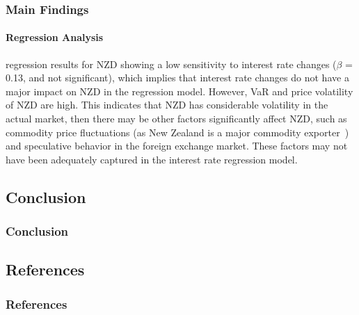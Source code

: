 \documentclass[10pt]{beamer}
\begin{document}
\begin{frame}
\frametitle{Main Findings}
\framesubtitle{Regression Analysis}
regression results for NZD showing a low sensitivity to interest rate changes ($\beta$ = 0.13, and not significant), which implies that interest rate changes
do not have a major impact on NZD in the regression model. However, VaR and price volatility of NZD are high. This indicates that NZD has considerable volatility
in the actual market, then there may be other factors significantly affect NZD, such as
commodity price fluctuations (as New Zealand is a major commodity exporter~\cite{blundell1990exchange}) and speculative behavior in the foreign exchange market. These factors may not have been
adequately captured in the interest rate regression model.
\end{frame}
\begin{frame}
\section{Conclusion}
\frametitle{Conclusion}

\end{frame}
\begin{frame}
\section{References}
\frametitle{References}
\printbibliography
\end{frame}
\end{document}
